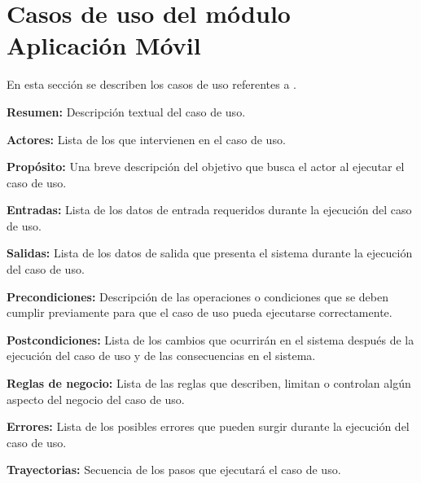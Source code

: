 
\section{Casos de uso del módulo Aplicación Móvil}
En esta sección se describen los casos de uso referentes a . \bigskip

     \begin{objetivos}
	\item {\bf Resumen:} Descripción textual del caso de uso.
	\item {\bf Actores:} Lista de los que intervienen en el caso de uso.
	\item {\bf Propósito:} Una breve descripción del objetivo que busca el actor al ejecutar el caso de uso.
	\item {\bf Entradas:} Lista de los datos de entrada requeridos durante la ejecución del caso de uso.
	\item {\bf Salidas:} Lista de los datos de salida que presenta el sistema durante la ejecución del caso de uso.
	\item {\bf Precondiciones:} Descripción de las operaciones o condiciones que se deben cumplir previamente para que el caso de uso pueda ejecutarse correctamente.
	\item {\bf Postcondiciones:} Lista de los cambios que ocurrirán en el sistema después de la ejecución del caso de uso y de las consecuencias en el sistema.
	\item {\bf Reglas de negocio:} Lista de las reglas que describen, limitan o controlan algún aspecto del negocio del caso de uso.
	\item {\bf Errores:} Lista de los posibles errores que pueden surgir durante la ejecución del caso de uso.
	\item {\bf Trayectorias:} Secuencia de los pasos que ejecutará el caso de uso.
    \end{objetivos}


